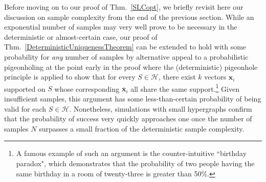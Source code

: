 \documentclass[journal, twocolumn]{IEEEtran}
\begin{document}
Before moving on to our proof of Thm.~\ref{SLCopt}, we briefly revisit here our discussion on sample complexity from the end of the previous section. While an exponential number of samples may very well prove to be necessary in the deterministic or almost-certain case, our proof of Thm.~\ref{DeterministicUniquenessTheorem} can be extended to hold with some probability for \emph{any} number of samples by alternative appeal to a probabilistic pigeonholing at the point early in the proof where the (deterministic) pigeonhole principle is applied to show that for every $S \in \mathcal{H}$, there exist $k$ vectors $\mathbf{x}_i$ supported on $S$ whose corresponding $\mathbf{\overline x}_i$ all share the same support.\footnote{A famous example of such an argument is the counter-intuitive ``birthday paradox", which demonstrates that the probability of two people having the same birthday in a room of twenty-three is greater than 50\%.} Given insufficient samples, this argument has some less-than-certain probability of being valid for each $S \in \mathcal{H}$. Nonetheless, simulations with small hypergraphs confirm that the probability of success very quickly approaches one once the number of samples $N$ surpasses a small fraction of the deterministic sample complexity. 
\end{document}
